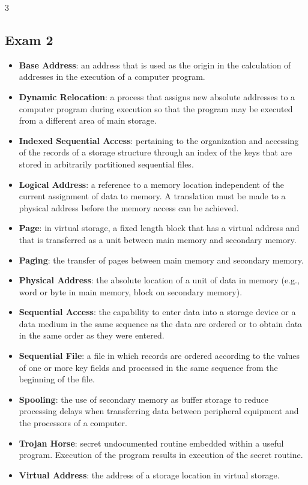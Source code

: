 \documentclass[fontsize=4.5pt]{scrartcl}
\begin{document}
\begin{multicols}{3}
    \subsection{Exam 2}
      \begin{itemize}
         \item \textbf{Base Address}: an address that is used as the origin in the calculation of addresses in the execution of a computer program.
         \item \textbf{Dynamic Relocation}: a process that assigns new absolute addresses to a computer program during execution so that the program may be executed from a different area of main storage.
         \item \textbf{Indexed Sequential Access}: pertaining to the organization and accessing of the records of a storage structure through an index of the keys that are stored in arbitrarily partitioned sequential files.
         \item \textbf{Logical Address}: a reference to a memory location independent of the current assignment of data to memory.  A translation must be made to a physical address before the memory access can be achieved.
         \item \textbf{Page}: in virtual storage, a fixed length block that has a virtual address and that is transferred as a unit between main memory and secondary memory.
         \item \textbf{Paging}: the transfer of pages between main memory and secondary memory.
         \item \textbf{Physical Address}: the absolute location of a unit of data in memory (e.g., word or byte in main memory, block on secondary memory).
         \item \textbf{Sequential Access}: the capability to enter data into a storage device or a data medium in the same sequence as the data are ordered or to obtain data in the same order as they were entered.
         \item \textbf{Sequential File}: a file in which records are ordered according to the values of one or more key fields and processed in the same sequence from the beginning of the file.
         \item \textbf{Spooling}: the use of secondary memory as buffer storage to reduce processing delays when transferring data between peripheral equipment and the processors of a computer.
         \item \textbf{Trojan Horse}: secret undocumented routine embedded within a useful program.  Execution of the program results in execution of the secret routine.
         \item \textbf{Virtual Address}: the address of a storage location in virtual storage.
      \end{itemize}
    

\end{multicols}
\end{document}
